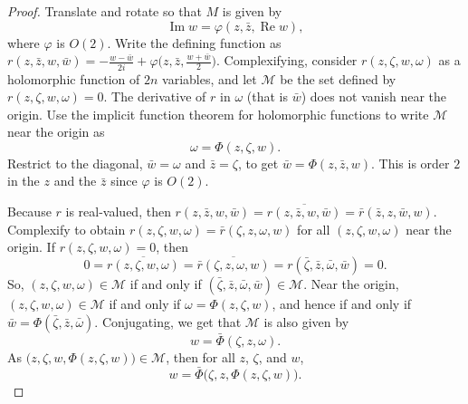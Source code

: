 \documentclass[12pt,openany]{book}
\renewcommand{\Re}{\operatorname{Re}}
\renewcommand{\Im}{\operatorname{Im}}
\newcommand{\sM}{{\mathscr{M}}}
\theoremstyle{plain}
\theoremstyle{remark}
\theoremstyle{definition}
\theoremstyle{exercise}
\theoremstyle{example}
\begin{document}
\begin{proof}
Translate and rotate so that $M$ is given by
\begin{equation*}
\Im w = \varphi(z,\bar{z},\Re w) ,
\end{equation*}
where $\varphi$ is $O(2)$.
Write the defining function
as $r(z,\bar{z},w,\bar{w}) = -\frac{w-\bar{w}}{2i}
+\varphi\bigl(z,\bar{z},\frac{w+\bar{w}}{2}\bigr)$.
Complexifying, consider
$r(z,\zeta,w,\omega)$ as
a holomorphic function of $2n$ variables,
and let $\sM$ be the set defined by
$r(z,\zeta,w,\omega) = 0$.
The derivative of $r$ in
$\omega$ (that is $\bar{w}$) does not vanish near the origin.
Use the implicit function theorem for holomorphic functions to write $\sM$
near the origin as
\begin{equation*}
\omega = \Phi(z,\zeta,w) .
\end{equation*}
Restrict to the diagonal, $\bar{w} = \omega$ and $\bar{z}=\zeta$,
to get
$\bar{w} = \Phi(z,\bar{z},w)$.  This is order $2$ in the $z$ and the $\bar{z}$
since $\varphi$ is $O(2)$.

Because $r$ is real-valued, then
$r(z,\bar{z},w,\bar{w}) =
\overline{r(z,\bar{z},w,\bar{w})} = \bar{r}(\bar{z},z,\bar{w},w)$.
Complexify to obtain
$r(z,\zeta,w,\omega) =
\bar{r}(\zeta,z,\omega,w)$ for all $(z,\zeta,w,\omega)$ near the origin.
If $r(z,\zeta,w,\omega) = 0$,
then
\begin{equation*}
0 = \overline{r(z,\zeta,w,\omega)} =
\overline{\bar{r}(\zeta,z,\omega,w)} =
r(\bar{\zeta},\bar{z},\bar{\omega},\bar{w}) =0.
\end{equation*}
So,
$(z,\zeta,w,\omega) \in \sM$
if and only if
$(\bar{\zeta},\bar{z},\bar{\omega},\bar{w}) \in \sM$.
Near the origin,
$(z,\zeta,w,\omega) \in \sM$ if and only if
$\omega = \Phi(z,\zeta,w)$, and hence
if and only if
$\bar{w} = \Phi(\bar{\zeta},\bar{z},\bar{\omega})$.
Conjugating, we get that $\sM$ is also given by
\begin{equation*}
w = \bar{\Phi}(\zeta,z,\omega).
\end{equation*}
As $\bigl(z,\zeta,w,\Phi(z,\zeta,w)\bigr) \in \sM$, then
for all $z$, $\zeta$, and $w$,
\begin{equation*}
w = \bar{\Phi}\bigl(\zeta,z,\Phi(z,\zeta,w)\bigr).
\end{equation*}


\end{proof}
\end{document}
